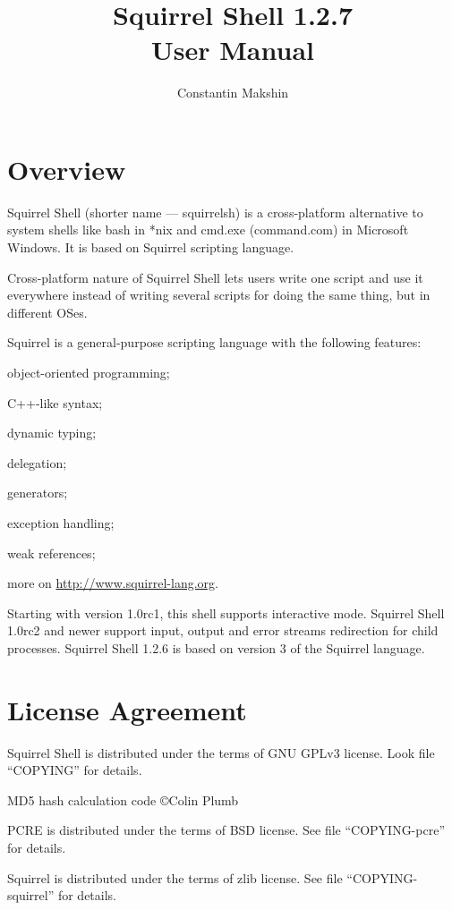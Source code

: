 \documentclass[a4paper, 10pt, titlepage]{article}
\title{Squirrel Shell 1.2.7 \\ User Manual}
\author{Constantin Makshin}
\begin{document}
\maketitle
\tableofcontents
\pagebreak

\section{Overview}

Squirrel Shell (shorter name --- squirrelsh) is a cross-platform alternative to system shells like bash in *nix and cmd.exe (command.com) in Microsoft Windows. It is based on Squirrel scripting language.

Cross-platform nature of Squirrel Shell lets users write one script and use it everywhere instead of writing several scripts for doing the same thing, but in different OSes.

Squirrel is a general-purpose scripting language with the following features:
\begin{itemize*}
\item object-oriented programming;
\item C++-like syntax;
\item dynamic typing;
\item delegation;
\item generators;
\item exception handling;
\item weak references;
\item more on \url{http://www.squirrel-lang.org}.
\end{itemize*}

Starting with version 1.0rc1, this shell supports interactive mode. Squirrel Shell 1.0rc2 and newer support input, output and error streams redirection for child processes. Squirrel Shell 1.2.6 is based on version 3 of the Squirrel language.

\section{License Agreement}

Squirrel Shell is distributed under the terms of GNU GPLv3 license. Look file ``COPYING'' for details.

MD5 hash calculation code \copyright Colin Plumb

PCRE is distributed under the terms of BSD license. See file ``COPYING-pcre'' for details.

Squirrel is distributed under the terms of zlib license. See file ``COPYING-squirrel'' for details.
\end{document}
